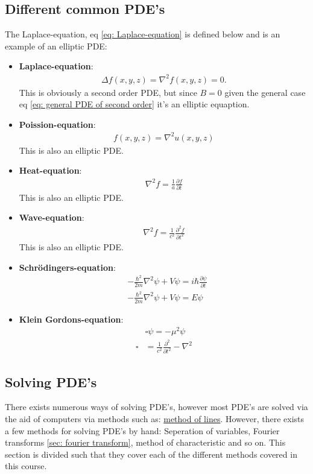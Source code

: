 \documentclass[12pt]{article}
\begin{document}
\subsection{Different common PDE's}
The Laplace-equation, eq \eqref{eq: Laplace-equation} is defined below and is an example of an elliptic PDE:
\begin{itemize}
    \item \textbf{Laplace-equation}: \begin{align}
    \Delta f(x,y,z) = \nabla^2 f(x,y,z) = 0.\label{eq: Laplace-equation}
\end{align}This is obviously a second order PDE, but since $B = 0$ given the general case eq \eqref{eq: general PDE of second order} it's an elliptic equaption.
    \item \textbf{Poission-equation}: \begin{align}f(x,y,z) = \nabla^2 u(x,y,z)\label{eq: Poission-equation}\end{align}This is also an elliptic PDE.
    \item \textbf{Heat-equation}: \begin{align*}\nabla^2f = \frac{1}{a}\frac{\partial f}{\partial t}\end{align*}This is also an elliptic PDE.
    \item \textbf{Wave-equation}:\begin{align*}
    \nabla^2f = \frac{1}{c^2}\frac{\partial^2 f}{\partial t^2}
\end{align*}This is also an elliptic PDE.
    \item \textbf{Schrödingers-equation}:\begin{align*}
    &-\frac{\hbar^2}{2 m}\nabla^2 \psi+ V\psi = i\hbar\frac{\partial \psi}{\partial t}\\
    &-\frac{\hbar^2}{2 m}\nabla^2 \psi+ V\psi = E\psi
\end{align*}
    \item \textbf{Klein Gordons-equation}: \begin{align*}
    &\square\psi = -\mu^2\psi\\
    \square &= \frac{1}{c^2}\frac{\partial^2}{\partial t^2} - \nabla^2
\end{align*}
\end{itemize}
\subsection{Solving PDE's}
There exists numerous ways of solving PDE's, however most PDE's are solved via the aid of computers via methods such as: \underline{method of lines}. However, there exists a few methods for solving PDE's by hand: Seperation of variables, Fourier transforms \ref{sec: fourier transform}, 
method of characteristic and so on. This section is divided such that they cover each of the different methods covered in this course.
\end{document}
